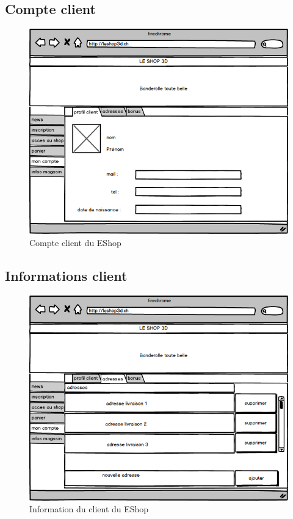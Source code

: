 \documentclass[12pt]{article}
\begin{document}
\subsection{Compte client}

\begin{figure}[ht]
    \center
    \includegraphics[scale=0.6]{../Maquettes/compte_client.jpeg}
    \caption*{Compte client du EShop}
\end{figure}

\subsection{Informations client}

\begin{figure}[ht]
    \center
    \includegraphics[scale=0.6]{../Maquettes/compte_client_adresse.jpeg}
    \caption*{Information du client du EShop}
\end{figure}
\end{document}
